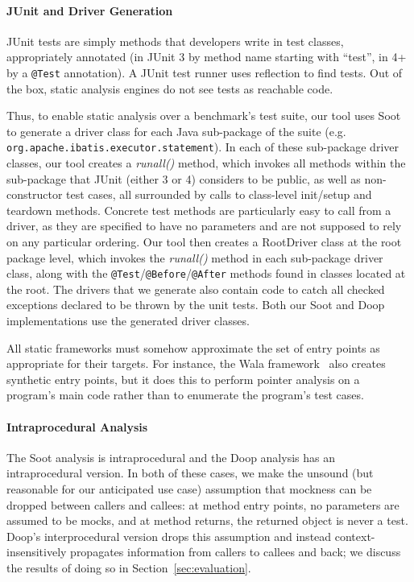 \paragraph{JUnit and Driver Generation}
JUnit tests are simply methods that developers write in test classes, appropriately annotated (in JUnit 3 by method name starting with ``test'', in 4+ by a \texttt{@Test} annotation). A JUnit test runner uses reflection to find tests. Out of the box, static analysis engines do not see tests as reachable code.


Thus, to enable static analysis over a benchmark's test suite, our tool uses Soot to generate a driver class for each Java sub-package of the suite (e.g. \texttt{org.apache.ibatis.executor.statement}). In each of these sub-package driver classes, our tool creates a \textit{runall()} method, which invokes all methods within the sub-package that JUnit (either 3 or 4) considers to be public, as well as non-constructor test cases, all surrounded by calls to class-level init/setup and teardown methods. Concrete test methods are particularly easy to call from a driver, as they are specified to have no parameters and are not supposed to rely on any particular ordering. 
Our tool then creates a RootDriver class at the root package level, which invokes the \textit{runall()} method in each sub-package driver class, along with the \texttt{@Test}/\texttt{@Before}/\texttt{@After} methods found in classes located at the root. The drivers that we generate also contain code to catch all checked exceptions declared to be thrown by the unit tests. Both our Soot and Doop implementations use the generated driver classes.

All static frameworks must somehow approximate the set of entry points as appropriate for their targets. For instance, the Wala framework~\cite{wala19:_t} also creates synthetic entry points, but it does this to perform pointer analysis on a program's main code rather than to enumerate the program's test cases.

\paragraph{Intraprocedural Analysis} The Soot analysis is intraprocedural and the Doop analysis has an intraprocedural version. In both of these cases, we make the unsound (but reasonable for our anticipated use case) assumption that mockness can be dropped between callers and callees: at method entry points, no parameters are assumed to be mocks, and at method returns, the returned object is never a test. Doop's interprocedural version drops this assumption and instead context-insensitively propagates information from callers to callees and back; we discuss the results of doing so in Section~\ref{sec:evaluation}.

